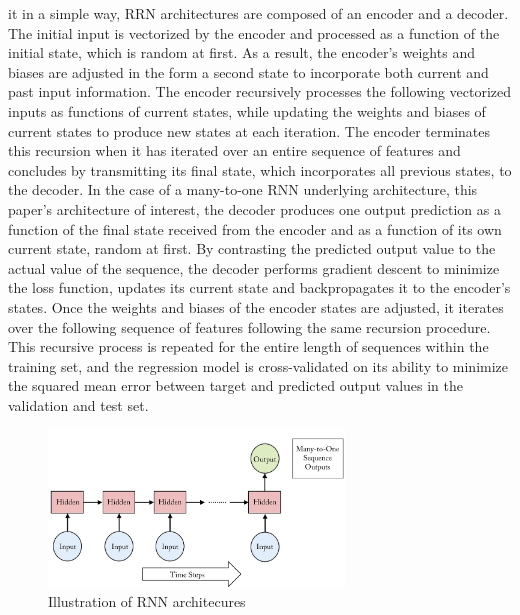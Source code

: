 \documentclass{article}
\begin{document}
it in a simple way, RRN architectures are composed of an encoder and a decoder. The initial input is vectorized by the encoder and processed as a function of the initial state, which is random at first. As a result, the encoder's weights and biases are adjusted in the form a second state to incorporate both current and past input information. The encoder recursively processes the following vectorized inputs as functions of current states, while updating the weights and biases of current states to produce new states at each iteration. The encoder terminates this recursion when it has iterated over an entire sequence of features and concludes by transmitting its final state, which incorporates all previous states, to the decoder. In the case of a many-to-one RNN underlying architecture, this paper's architecture of interest, the decoder produces one output prediction as a function of the final state received from the encoder and as a function of its own current state, random at first. By contrasting the predicted output value to the actual value of the sequence, the decoder performs gradient descent to minimize the loss function, updates its current state and backpropagates it to the encoder's states. Once the weights and biases of the encoder states are adjusted, it iterates over the following sequence of features following the same recursion procedure. This recursive process is repeated for the entire length of sequences within the training set, and the regression model is cross-validated on its ability to minimize the squared mean error between target and predicted output values in the validation and test set. 
\begin{figure}
    \caption{Illustration of RNN architecures}
    \includegraphics[width=0.7\textwidth]{images/2023-03-17-16-42-13.png}
\end{figure}
\end{document}

